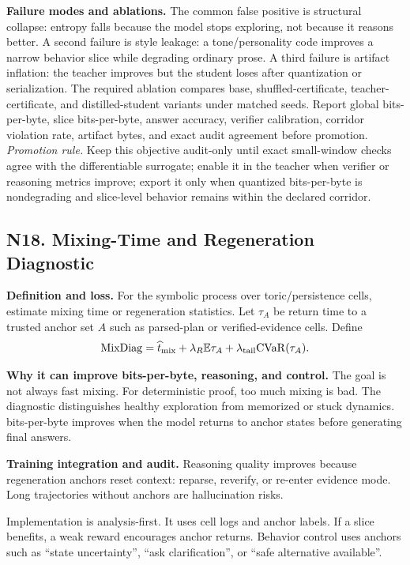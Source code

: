 \documentclass[10pt]{article}
\numberwithin{equation}{section}
\begin{document}
\noindent\textbf{Failure modes and ablations.} The common false positive is structural collapse: entropy falls because the model stops exploring, not because it reasons better. A second failure is style leakage: a tone/personality code improves a narrow behavior slice while degrading ordinary prose. A third failure is artifact inflation: the teacher improves but the student loses after quantization or serialization. The required ablation compares base, shuffled-certificate, teacher-certificate, and distilled-student variants under matched seeds. Report global bits-per-byte, slice bits-per-byte, answer accuracy, verifier calibration, corridor violation rate, artifact bytes, and exact audit agreement before promotion.
\vfill
\noindent\emph{Promotion rule.} Keep this objective audit-only until exact small-window checks agree with the differentiable surrogate; enable it in the teacher when verifier or reasoning metrics improve; export it only when quantized bits-per-byte is nondegrading and slice-level behavior remains within the declared corridor.
\clearpage
\subsection{N18. Mixing-Time and Regeneration Diagnostic}
\noindent\textbf{Definition and loss.} For the symbolic process over toric/persistence cells, estimate mixing time or regeneration statistics. Let $\tau_A$ be return time to a trusted anchor set $A$ such as parsed-plan or verified-evidence cells. Define
\[
\mathrm{MixDiag}=\widehat t_{\rm mix}+\lambda_R\mathbb E\tau_A+\lambda_{\rm tail}\mathrm{CVaR}(\tau_A).
\]

\noindent\textbf{Why it can improve bits-per-byte, reasoning, and control.} The goal is not always fast mixing. For deterministic proof, too much mixing is bad. The diagnostic distinguishes healthy exploration from memorized or stuck dynamics. bits-per-byte improves when the model returns to anchor states before generating final answers.

\noindent\textbf{Training integration and audit.} Reasoning quality improves because regeneration anchors reset context: reparse, reverify, or re-enter evidence mode. Long trajectories without anchors are hallucination risks.

Implementation is analysis-first. It uses cell logs and anchor labels. If a slice benefits, a weak reward encourages anchor returns. Behavior control uses anchors such as ``state uncertainty'', ``ask clarification'', or ``safe alternative available''.
\end{document}
